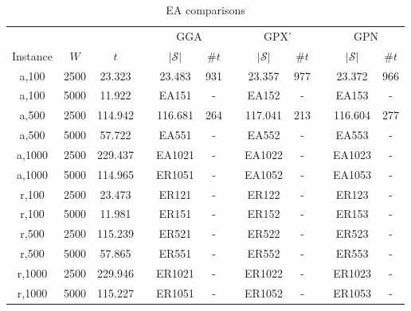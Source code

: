 \documentclass{elsarticle}
\begin{document}
\begin{table}[h!]
	\centering
	\caption{EA comparisons}
	\begin{tabular}{cccccccccccc}\toprule
		& & & &\multicolumn{2}{c}{GGA} &\phantom{a}& \multicolumn{2}{c}{GPX'} &\phantom{a}& \multicolumn{2}{c}{GPN}\\
		\cmidrule{5-6} \cmidrule{8-9} \cmidrule{11-12}
		Instance & $W$ & $t$ && $|\mathcal{S}|$ & $\# t$ && $|\mathcal{S}|$ & $\# t$ && $|\mathcal{S}|$ & $\# t$ \\ \midrule	
		a,100 & 2500 & 23.323 && 23.483 & 931 && 23.357 & 977 && 23.372 & 966 \\
		a,100 & 5000 & 11.922 && EA151 & - && EA152 & - && EA153 & -\\
		\midrule
		a,500 & 2500 & 114.942 && 116.681 & 264 && 117.041 & 213 && 116.604 & 277 \\
		a,500 & 5000 & 57.722 && EA551 & - && EA552 & - && EA553 & -\\
		\midrule
		a,1000 & 2500 & 229.437 && EA1021 & - && EA1022 & - && EA1023 & -\\
		a,1000 & 5000 & 114.965 && ER1051 & - && EA1052 & - && EA1053 & -\\
		\midrule
		\midrule
		r,100 & 2500 & 23.473 && ER121 & - && ER122 & - && ER123 & -\\
		r,100 & 5000 & 11.981 && ER151 & - && ER152 & - && ER153 & -\\
		\midrule
		r,500 & 2500 & 115.239 && ER521 & - && ER522 & - && ER523 & -\\
		r,500 & 5000 & 57.865 && ER551 & - && ER552 & - && ER553 & -\\
		\midrule
		r,1000 & 2500 & 229.946 && ER1021 & - && ER1022 & - && ER1023 & -\\
		r,1000 & 5000 & 115.227 && ER1051 & - && ER1052 & - && ER1053 & -\\
		\bottomrule
	\end{tabular}	
	\label{table:ea}
\end{table}
\end{document}
